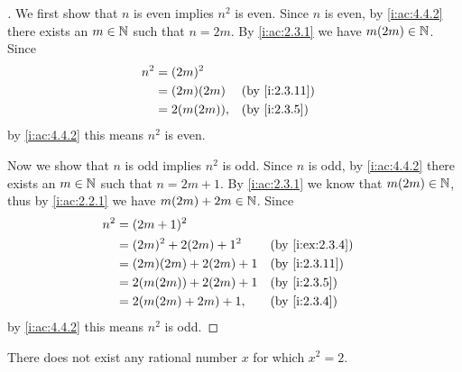 \begin{proof}[]
  We first show that \(n\) is even implies \(n^2\) is even.
  Since \(n\) is even, by \cref{i:ac:4.4.2} there exists an \(m \in \mathbb{N}\) such that \(n = 2m\).
  By \cref{i:ac:2.3.1} we have \(m (2m) \in \mathbb{N}\).
  Since
  \begin{align*}
    n^2 & = (2m)^2                         \\
        & = (2m) (2m)   &  & \by{i:2.3.11} \\
        & = 2 (m (2m)), &  & \by{i:2.3.5}
  \end{align*}
  by \cref{i:ac:4.4.2} this means \(n^2\) is even.

  Now we show that \(n\) is odd implies \(n^2\) is odd.
  Since \(n\) is odd, by \cref{i:ac:4.4.2} there exists an \(m \in \mathbb{N}\) such that \(n = 2m + 1\).
  By \cref{i:ac:2.3.1} we know that \(m (2m) \in \mathbb{N}\), thus by \cref{i:ac:2.2.1} we have \(m (2m) + 2m \in \mathbb{N}\).
  Since
  \begin{align*}
    n^2 & = (2m + 1)^2                                   \\
        & = (2m)^2 + 2 (2m) + 1^2   &  & \by{i:ex:2.3.4} \\
        & = (2m) (2m) + 2 (2m) + 1  &  & \by{i:2.3.11}   \\
        & = 2 (m (2m)) + 2 (2m) + 1 &  & \by{i:2.3.5}    \\
        & = 2 (m (2m) + 2m) + 1,    &  & \by{i:2.3.4}
  \end{align*}
  by \cref{i:ac:4.4.2} this means \(n^2\) is odd.
\end{proof}

\begin{prop}\label{i:4.4.4}
  There does not exist any rational number \(x\) for which \(x^2 = 2\).
\end{prop}

